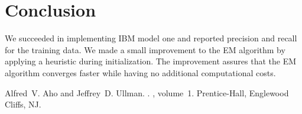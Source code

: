 \documentclass[11pt]{article}
\begin{document}
\section{Conclusion}
We succeeded in implementing IBM model one and reported precision and recall for the training data. We made a small improvement to the EM algorithm by applying a heuristic during initialization. The improvement assures that the EM algorithm converges faster while having no additional computational costs.
\begin{thebibliography}{}

Alfred~V. Aho and Jeffrey~D. Ullman.
.
, volume~1.
\newblock Prentice-{Hall}, Englewood Cliffs, NJ.


\end{thebibliography}
\end{document}
